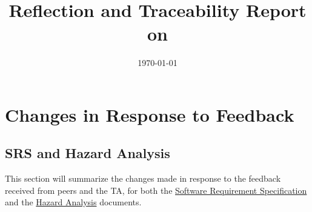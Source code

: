\documentclass{article}
\title{Reflection and Traceability Report on \progname}
\author{\authname}
\date{\today}
\begin{document}
\maketitle

\section{Changes in Response to Feedback}

\subsection{SRS and Hazard Analysis}
This section will summarize the changes made in response to the feedback received from peers and the TA, for both the \href{https://github.com/felix-hurst/Ad-Natura/blob/main/docs/SRS/SRS.pdf}{Software Requirement Specification} and the \href{https://github.com/felix-hurst/Ad-Natura/blob/main/docs/HazardAnalysis/HazardAnalysis.pdf}{Hazard Analysis} documents.
\end{document}
